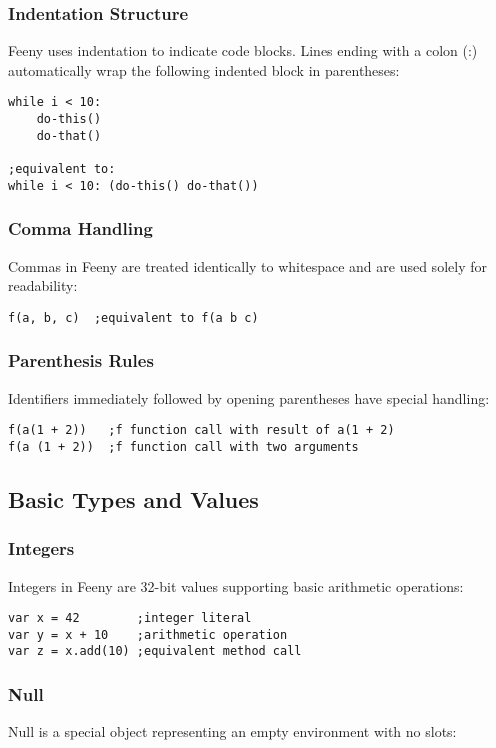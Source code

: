 \documentclass[12pt, a4paper]{article}
\begin{document}
\subsubsection{Indentation Structure}
Feeny uses indentation to indicate code blocks. Lines ending with a colon (:) automatically wrap the following indented block in parentheses:

\begin{lstlisting}
while i < 10:
    do-this()
    do-that()
    
;equivalent to:
while i < 10: (do-this() do-that())
\end{lstlisting}

\subsubsection{Comma Handling}
Commas in Feeny are treated identically to whitespace and are used solely for readability:

\begin{lstlisting}
f(a, b, c)  ;equivalent to f(a b c)
\end{lstlisting}

\subsubsection{Parenthesis Rules}
Identifiers immediately followed by opening parentheses have special handling:

\begin{lstlisting}
f(a(1 + 2))   ;f function call with result of a(1 + 2)
f(a (1 + 2))  ;f function call with two arguments
\end{lstlisting}

\subsection{Basic Types and Values}

\subsubsection{Integers}
Integers in Feeny are 32-bit values supporting basic arithmetic operations:

\begin{lstlisting}
var x = 42        ;integer literal
var y = x + 10    ;arithmetic operation
var z = x.add(10) ;equivalent method call
\end{lstlisting}

\subsubsection{Null}
Null is a special object representing an empty environment with no slots:
\end{document}

